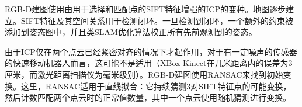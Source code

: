 
RGB-D建图使用由用于选择和匹配点的SIFT特征增强的ICP的变种。地图逐步建立。SIFT特征及其空间关系用于检测闭环。一旦检测到闭环，一个额外的约束被添加到姿态图中，并且类SLAM优化算法校正所有先前观测到的姿态。


由于ICP仅在两个点云已经紧密对齐的情况下才起作用，对于有一定噪声的传感器的快速移动机器人而言，这可能不是适用（XBox Kinect在几米距离内的误差为3厘米，而激光距离扫描仪为毫米级别）。RGB-D建图使用RANSAC来找到初始变换。这里，RANSAC适用于直线拟合：它持续猜测3对SIFT特征点的可能变换，然后计数匹配两个点云时的正常值数量，其中一个点云使用随机猜测进行变换。